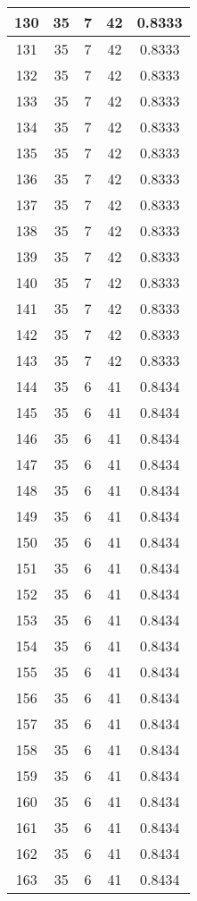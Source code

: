 \documentclass[letterpaper, 12pt]{article}
\begin{document}
\begin{longtable}{|c|c|c|c|c|}
\hline
130 & 35 & 7 & 42 & 0.8333 \\
\hline
131 & 35 & 7 & 42 & 0.8333 \\
\hline
132 & 35 & 7 & 42 & 0.8333 \\
\hline
133 & 35 & 7 & 42 & 0.8333 \\
\hline
134 & 35 & 7 & 42 & 0.8333 \\
\hline
135 & 35 & 7 & 42 & 0.8333 \\
\hline
136 & 35 & 7 & 42 & 0.8333 \\
\hline
137 & 35 & 7 & 42 & 0.8333 \\
\hline
138 & 35 & 7 & 42 & 0.8333 \\
\hline
139 & 35 & 7 & 42 & 0.8333 \\
\hline
140 & 35 & 7 & 42 & 0.8333 \\
\hline
141 & 35 & 7 & 42 & 0.8333 \\
\hline
142 & 35 & 7 & 42 & 0.8333 \\
\hline
143 & 35 & 7 & 42 & 0.8333 \\
\hline
144 & 35 & 6 & 41 & 0.8434 \\
\hline
145 & 35 & 6 & 41 & 0.8434 \\
\hline
146 & 35 & 6 & 41 & 0.8434 \\
\hline
147 & 35 & 6 & 41 & 0.8434 \\
\hline
148 & 35 & 6 & 41 & 0.8434 \\
\hline
149 & 35 & 6 & 41 & 0.8434 \\
\hline
150 & 35 & 6 & 41 & 0.8434 \\
\hline
151 & 35 & 6 & 41 & 0.8434 \\
\hline
152 & 35 & 6 & 41 & 0.8434 \\
\hline
153 & 35 & 6 & 41 & 0.8434 \\
\hline
154 & 35 & 6 & 41 & 0.8434 \\
\hline
155 & 35 & 6 & 41 & 0.8434 \\
\hline
156 & 35 & 6 & 41 & 0.8434 \\
\hline
157 & 35 & 6 & 41 & 0.8434 \\
\hline
158 & 35 & 6 & 41 & 0.8434 \\
\hline
159 & 35 & 6 & 41 & 0.8434 \\
\hline
160 & 35 & 6 & 41 & 0.8434 \\
\hline
161 & 35 & 6 & 41 & 0.8434 \\
\hline
162 & 35 & 6 & 41 & 0.8434 \\
\hline
163 & 35 & 6 & 41 & 0.8434 \\

\end{longtable}
\end{document}
